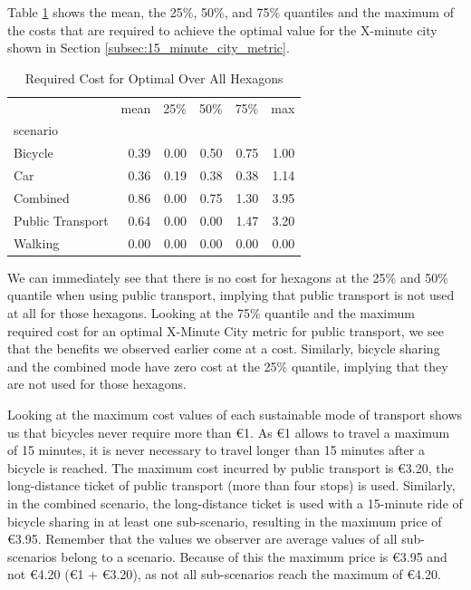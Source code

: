 Table \ref{tab:required_cost} shows the mean, the 25\%, 50\%, and 75\% quantiles and the maximum of the costs that are required to achieve the optimal value for the X-minute city shown in Section \ref{subsec:15_minute_city_metric}.
\begin{table}
  \caption{Required Cost for Optimal Over All Hexagons}
  \label{tab:required_cost}
  \begin{center}
    \begin{tabular}{lrrrrr}
     & mean & 25\% & 50\% & 75\% & max \\
    scenario &  &  &  &  &  \\
    Bicycle & 0.39 & 0.00 & 0.50 & 0.75 & 1.00 \\
    Car & 0.36 & 0.19 & 0.38 & 0.38 & 1.14 \\
    Combined & 0.86 & 0.00 & 0.75 & 1.30 & 3.95 \\
    Public Transport & 0.64 & 0.00 & 0.00 & 1.47 & 3.20 \\
    Walking & 0.00 & 0.00 & 0.00 & 0.00 & 0.00 \\
    \end{tabular}
  \end{center}
\end{table}
We can immediately see that there is no cost for hexagons at the 25\% and 50\% quantile when using public transport, implying that public transport is not used at all for those hexagons.
Looking at the 75\% quantile and the maximum required cost for an optimal X-Minute City metric for public transport, we see that the benefits we observed earlier come at a cost.
Similarly, bicycle sharing and the combined mode have zero cost at the 25\% quantile, implying that they are not used for those hexagons.

Looking at the maximum cost values of each sustainable mode of transport shows us that bicycles never require more than \euro{1}.
As \euro{1} allows to travel a maximum of 15 minutes, it is never necessary to travel longer than 15 minutes after a bicycle is reached.
The maximum cost incurred by public transport is \euro{3.20}, the long-distance ticket of public transport (more than four stops) is used.
Similarly, in the combined scenario, the long-distance ticket is used with a 15-minute ride of bicycle sharing in at least one sub-scenario, resulting in the maximum price of \euro{3.95}.
Remember that the values we observer are average values of all sub-scenarios belong to a scenario.
Because of this the maximum price is \euro{3.95} and not \euro{4.20} (\euro{1} + \euro{3.20}), as not all sub-scenarios reach the maximum of \euro{4.20}.

